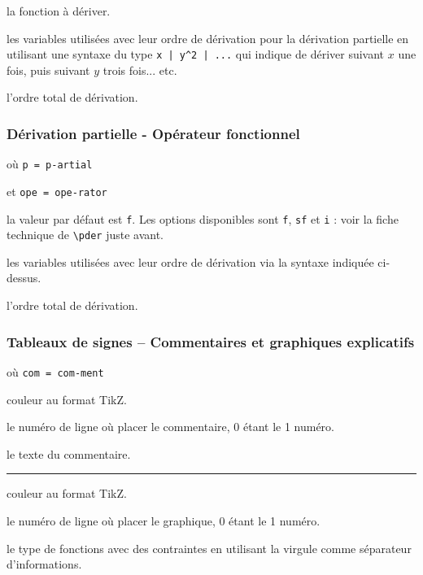 \documentclass[12pt,a4paper]{article}
\newcommand\env[1]{\texttt{#1}}
\newcommand\macro[1]{\env{\textbackslash{}#1}}
\theoremstyle{definition}
\newcommand\separation{
	\medskip
	\hfill\rule{0.5\textwidth}{0.75pt}\hfill
	\medskip
}
\newcommand\mwhyprefix[2]{%
	\texttt{#1 = #1-#2}%
}
\begin{document}
 la fonction à dériver.

 les variables utilisées avec leur ordre de dérivation pour la dérivation partielle en utilisant une syntaxe du type \verb+x | y^2 | ...+ qui indique de dériver suivant $x$ une fois, puis suivant $y$ trois fois... etc.

 l'ordre total de dérivation.




\subsubsection{Dérivation partielle - Opérateur fonctionnel}

 où \quad \mwhyprefix{p}{artial}
                              et \mwhyprefix{ope}{rator}

\IDoption{} la valeur par défaut est \verb+f+. Les options disponibles sont \verb+f+, \verb+sf+ et \verb+i+ : voir la fiche technique de \macro{pder} juste avant.

 les variables utilisées avec leur ordre de dérivation via la syntaxe indiquée ci-dessus.

 l'ordre total de dérivation.

\subsubsection{Tableaux de signes -- Commentaires et graphiques explicatifs}

  où \quad \mwhyprefix{com}{ment}


\IDoption{} couleur au format TikZ.


 le numéro de ligne où placer le commentaire, $0$ étant le 1\ier{} numéro.

 le texte du commentaire.


\separation




\IDoption{} couleur au format TikZ.


 le numéro de ligne où placer le graphique, $0$ étant le 1\ier{} numéro.


 le type de fonctions avec des contraintes en utilisant la virgule comme séparateur d'informations.
\end{document}
